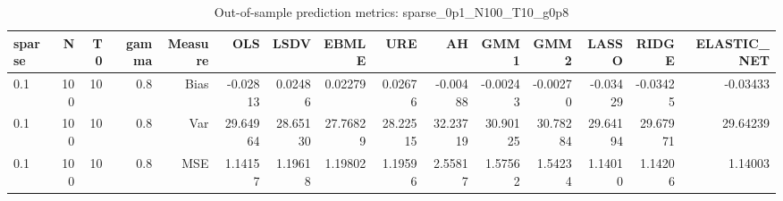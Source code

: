 \begin{table}[!htbp]\centering
\caption{Out-of-sample prediction metrics: sparse_0p1_N100_T10_g0p8}
\label{tab:table3_sparse_0p1_N100_T10_g0p8}
\begin{tabular}{lrrrrrrrrrrrrrr}
\hline
sparse & N & T0 & gamma & Measure & OLS & LSDV & EBMLE & URE & AH & GMM1 & GMM2 & LASSO & RIDGE & ELASTIC_NET \\
\hline
0.1 & 100 & 10 & 0.8 & Bias & -0.02813 & 0.02486 & 0.02279 & 0.02676 & -0.00488 & -0.00243 & -0.00270 & -0.03429 & -0.03425 & -0.03433 \\
0.1 & 100 & 10 & 0.8 & Var & 29.64964 & 28.65130 & 27.76829 & 28.22515 & 32.23719 & 30.90125 & 30.78284 & 29.64194 & 29.67971 & 29.64239 \\
0.1 & 100 & 10 & 0.8 & MSE & 1.14157 & 1.19618 & 1.19802 & 1.19596 & 2.55817 & 1.57562 & 1.54234 & 1.14010 & 1.14206 & 1.14003 \\
\hline
\end{tabular}
\end{table}

